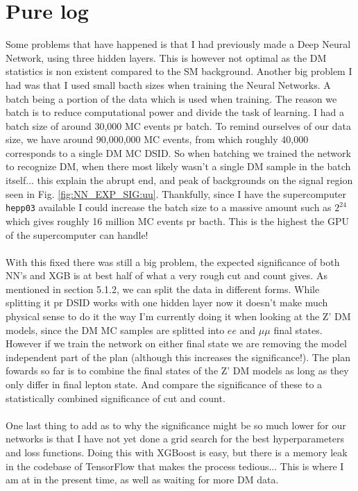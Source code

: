 \documentclass[14pt, a4paper]{book}
\begin{document}
\section{Pure log}
Some problems that have happened is that I had previously made a Deep Neural Network, using three hidden layers. This is however not optimal as the DM statistics is non existent compared to the SM background. Another big problem I had was that I used small bacth sizes when training the Neural Networks. A batch being a portion of the data which is used when training. The reason we batch is to reduce computational power and divide the task of learning. I had a batch size of around 30,000 MC events pr batch. To remind ourselves of our data size, we have around 90,000,000 MC events, from which roughly 40,000 corresponds to a single DM MC DSID. So when batching we trained the network to recognize DM, when there most likely wasn't a single DM sample in the batch itself... this explain the abrupt end, and peak of backgrounds on the signal region seen in Fig. \ref{fig:NN_EXP_SIG:uu}. Thankfully, since I have the supercomputer \verb|hepp03| available I could increase the batch size to a massive amount such as $2^24$ which gives roughly 16 million MC events pr bacth. This is the highest the GPU of the supercomputer can handle!\\
\\With this fixed there was still a big problem, the expected significance of both NN's and XGB is at best half of what a very rough cut and count gives. As mentioned in section 5.1.2, we can split the data in different forms. While splitting it pr DSID works with one hidden layer now it doesn't make much physical sense to do it the way I'm currently doing it when looking at the Z' DM models, since the DM MC samples are splitted into $ee$ and $\mu\mu$ final states. However if we train the network on either final state we are removing the model independent part of the plan (although this increases the significance!). The plan fowards so far is to combine the final states of the Z' DM models as long as they only differ in final lepton state. And compare the significance of these to a statistically combined significance of cut and count.\\
\\One last thing to add as to why the significance might be so much lower for our networks is that I have not yet done a grid search for the best hyperparameters and loss functions. Doing this with XGBoost is easy, but there is a memory leak in the codebase of TensorFlow that makes the process tedious... This is where I am at in the present time, as well as waiting for more DM data.
\end{document}
